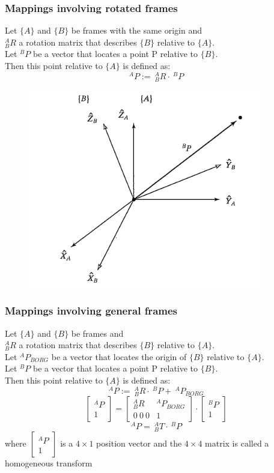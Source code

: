 \documentclass[10pt,a4paper]{article}
\newcommand{\vect}[1]{\ensuremath{\begin{bmatrix}#1\end{bmatrix}}}
\begin{document}
\subsubsection{Mappings involving rotated frames}
Let $\{A\}$ and $\{B\}$ be frames with the same origin and \\
$^A_BR$ a rotation matrix that describes $\{B\}$ relative to $\{A\}$. \\
Let $^BP$ be a vector that locates a point P relative to $\{B\}$. \\
Then this point relative to $\{A\}$ is defined as:
\begin{equation*}
^AP := ~^A_BR ⋅ ~^BP
\end{equation*}

\begin{figure}[H]
	\includegraphics[width=0.5\columnwidth]{imgs/rotation}
\end{figure}

\subsubsection{Mappings involving general frames}
Let $\{A\}$ and $\{B\}$ be frames and\\
$^A_BR$ a rotation matrix that describes $\{B\}$ relative to $\{A\}$. \\
Let $^AP_{BORG}$ be a vector that locates the origin of $\{B\}$ relative to $\{A\}$. \\
Let $^BP$ be a vector that locates a point P relative to $\{B\}$. \\
Then this point relative to $\{A\}$ is defined as:
\begin{equation*}
^AP := ~^A_BR ⋅ ~^BP + ~^AP_{BORG}
\end{equation*}
\begin{equation*}
\vect{^AP \\ 1} = \left[\begin{array}{c|c}
^A_BR & ^AP_{BORG} \\ \hline 0~ 0~ 0 & 1
\end{array}\right] ⋅ \vect{^BP \\ 1}
\end{equation*}
\begin{equation*}
	^AP =~ ^A_BT ⋅~^BP
\end{equation*}
where $\vect{^AP \\ 1}$ is a $4 \times 1$ position vector and the $4 \times 4$ matrix is called a homogeneous transform
\end{document}

